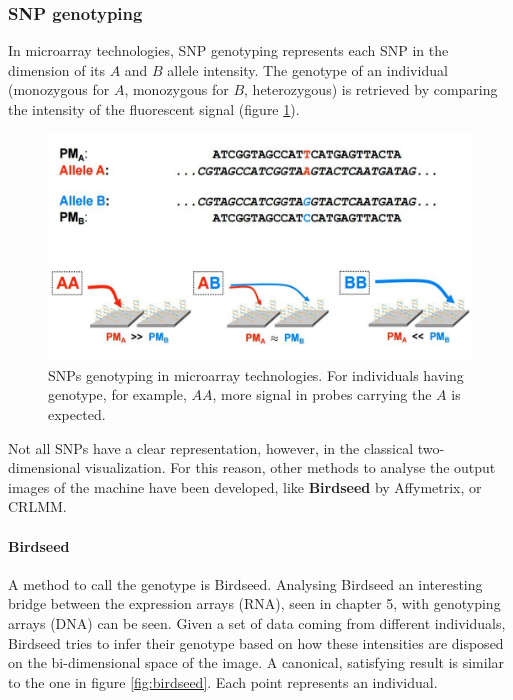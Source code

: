 		\subsubsection{SNP genotyping}
		In microarray technologies, SNP genotyping represents each SNP in the dimension of its $A$ and $B$ allele intensity.
		The genotype of an individual (monozygous for $A$, monozygous for $B$, heterozygous) is retrieved by comparing the intensity of the fluorescent signal (figure \ref{fig:geno}).

		\begin{figure}[H]
			\centering
			\includegraphics[scale=0.3]{genotype}
			\caption{SNPs genotyping in microarray technologies. For individuals having genotype, for example, $AA$, more signal in probes carrying the $A$ is expected.}
			\label{fig:geno}
		\end{figure}

		Not all SNPs have a clear representation, however, in the classical two-dimensional visualization.
		For this reason, other methods to analyse the output images of the machine have been developed, like \textbf{Birdseed} by Affymetrix, or CRLMM.

			\paragraph{Birdseed}
			A method to call the genotype is Birdseed.
			Analysing Birdseed an interesting bridge between the expression arrays (RNA), seen in chapter 5, with genotyping arrays (DNA) can be seen.
			Given a set of data coming from different individuals, Birdseed tries to infer their genotype based on how these intensities are disposed on the bi-dimensional space of the image.
			A canonical, satisfying result is similar to the one in figure \ref{fig:birdseed}.
			Each point represents an individual.


